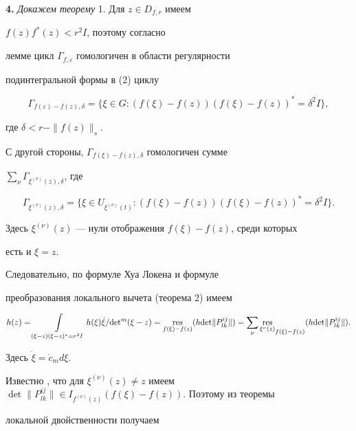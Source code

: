 


{\bf 4.} {\it Докажем теорему} 1. Для $z\in D_{f,r}$ имеем 


$f(z)f^*(z)<r^2I$, поэтому согласно 


лемме цикл $\Gamma_{f,\varepsilon}$ гомологичен в области регулярности 


подинтегральной формы в (2) циклу 


$$ 


\Gamma_{f(\varepsilon)-f(z),\delta}= 


\{\xi\in G:(f(\xi)-f(z))(f(\xi)-f(z))^*=\delta^2I\}, 


$$ 


где $\delta<r-\|f(z)\|_s$. 


 


С другой стороны, $\Gamma_{f(\xi)-f(z),\delta}$ гомологичен сумме 


$\sum\limits_\nu \Gamma_{\xi^{(\nu)}(z),\delta}$, где 


$$ 


\Gamma_{\xi^{(\nu)}(z),\delta}=\{\xi\in U_{\xi^{(\nu)}(t)}: 


(f(\xi)-f(z))(f(\xi)-f(z))^*=\delta^2I\}. 


$$ 


Здесь $\xi^{(\nu)}(z)$ --- нули отображения $f(\xi)-f(z)$, среди которых 


есть и $\xi=z$. 


 


Следовательно, по формуле Хуа Локена \cite{1} и формуле 


преобразования локального вычета (теорема 2) имеем 


$$ 


h(z)=\int\limits_{(\xi-z)(\xi-z)^*=r^2I} 


h(\xi)\Dot\xi/\det{}^m(\xi-z)=\res_{f(\xi)-f(z)} 


(h\det\|P^{i j}_{l k}\|)=\sum_\nu {\res_{\xi^\nu(z)}}_{f(\xi)-f(z)}


(h\det\|P^{i j}_{l k}\|). 


$$ 


Здесь $\Dot\xi=\Dot c_m d\xi$.


 


Известно \cite{3}, что для $\xi^{(\nu)}(z)\ne z$ имеем $\det\|P^{i 


j}_{l k}\|\in I_{f^{(\nu)}(z)}(f(\xi)-f(z))$. Поэтому из теоремы 


локальной двойственности получаем 


